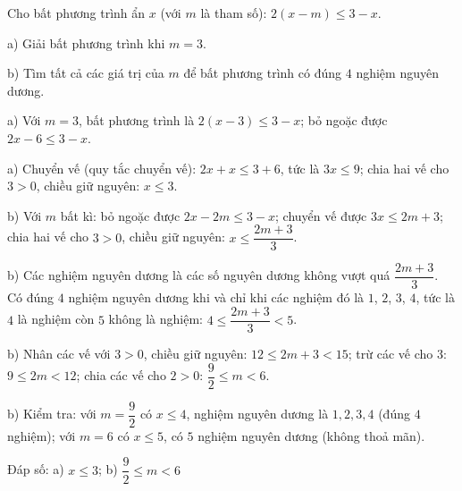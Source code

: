\begin{problem}[9DS-BPT-019]
Cho bất phương trình ẩn $x$ (với $m$ là tham số): $2(x - m) \leq 3 - x$.

a) Giải bất phương trình khi $m = 3$.

b) Tìm tất cả các giá trị của $m$ để bất phương trình có đúng $4$ nghiệm nguyên dương.

\begin{solution}
a) Với $m = 3$, bất phương trình là $2(x - 3) \leq 3 - x$; bỏ ngoặc được $2x - 6 \leq 3 - x$.

a) Chuyển vế (quy tắc chuyển vế): $2x + x \leq 3 + 6$, tức là $3x \leq 9$; chia hai vế cho $3 > 0$, chiều giữ nguyên: $x \leq 3$.

b) Với $m$ bất kì: bỏ ngoặc được $2x - 2m \leq 3 - x$; chuyển vế được $3x \leq 2m + 3$; chia hai vế cho $3 > 0$, chiều giữ nguyên: $x \leq \dfrac{2m + 3}{3}$.

b) Các nghiệm nguyên dương là các số nguyên dương không vượt quá $\dfrac{2m + 3}{3}$. Có đúng $4$ nghiệm nguyên dương khi và chỉ khi các nghiệm đó là $1$, $2$, $3$, $4$, tức là $4$ là nghiệm còn $5$ không là nghiệm: $4 \leq \dfrac{2m + 3}{3} < 5$.

b) Nhân các vế với $3 > 0$, chiều giữ nguyên: $12 \leq 2m + 3 < 15$; trừ các vế cho $3$: $9 \leq 2m < 12$; chia các vế cho $2 > 0$: $\dfrac{9}{2} \leq m < 6$.

b) Kiểm tra: với $m = \dfrac{9}{2}$ có $x \leq 4$, nghiệm nguyên dương là $1, 2, 3, 4$ (đúng $4$ nghiệm); với $m = 6$ có $x \leq 5$, có $5$ nghiệm nguyên dương (không thoả mãn).

Đáp số: a) $\boxed{x \leq 3}$; b) $\boxed{\dfrac{9}{2} \leq m < 6}$
\end{solution}
\end{problem}


